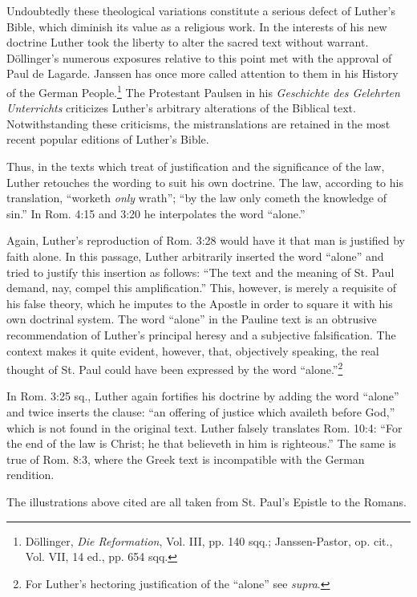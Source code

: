 Undoubtedly these theological variations constitute a serious defect
of Luther’s Bible, which diminish its value as a religious work. In the
interests of his new doctrine Luther took the liberty to alter the
sacred text without warrant. Döllinger’s numerous exposures relative
to this point met with the approval of Paul de Lagarde. Janssen has
once more called attention to them in his History of the German
People.\footnote{Döllinger, \textit{Die Reformation}, Vol. III, pp. 140 sqq.; Janssen-Pastor, op. cit., Vol. VII,
14 ed., pp. 654 sqq.}
The Protestant Paulsen in his \textit{Geschichte des Gelehrten Unterrichts}
criticizes Luther’s arbitrary alterations of the Biblical text.
Notwithstanding these criticisms, the mistranslations are retained in
the most recent popular editions of Luther’s Bible.

Thus, in the texts which treat of justification and the significance of the
law, Luther retouches the wording to suit his own doctrine. The law, according
to his translation, “worketh \textit{only} wrath”; “by the law only cometh
the knowledge of sin.” In Rom. 4:15 and 3:20 he interpolates the word
“alone.”

Again, Luther’s reproduction of Rom. 3:28 would have it that man is
justified by faith alone. In this passage, Luther arbitrarily inserted the word
“alone” and tried to justify this insertion as follows: “The text and the
meaning of St. Paul demand, nay, compel this amplification.” This, however,
is merely a requisite of his false theory, which he imputes to the Apostle in
order to square it with his own doctrinal system. The word “alone” in
the Pauline text is an obtrusive recommendation of Luther’s principal
heresy and a subjective falsification. The context makes it quite evident,
however, that, objectively speaking, the real thought of St. Paul could have
been expressed by the word ``alone.''\footnote
{For Luther’s hectoring justification of the “alone” see \textit{supra}.}

In Rom. 3:25 sq., Luther again fortifies his doctrine by adding the
word “alone” and twice inserts the clause: “an offering of justice which
availeth before God,” which is not found in the original text. Luther falsely
translates Rom. 10:4: “For the end of the law is Christ; he that believeth in
him is righteous.” The same is true of Rom. 8:3, where the Greek text
is incompatible with the German rendition.

The illustrations above cited are all taken from St. Paul’s Epistle to the
Romans.

